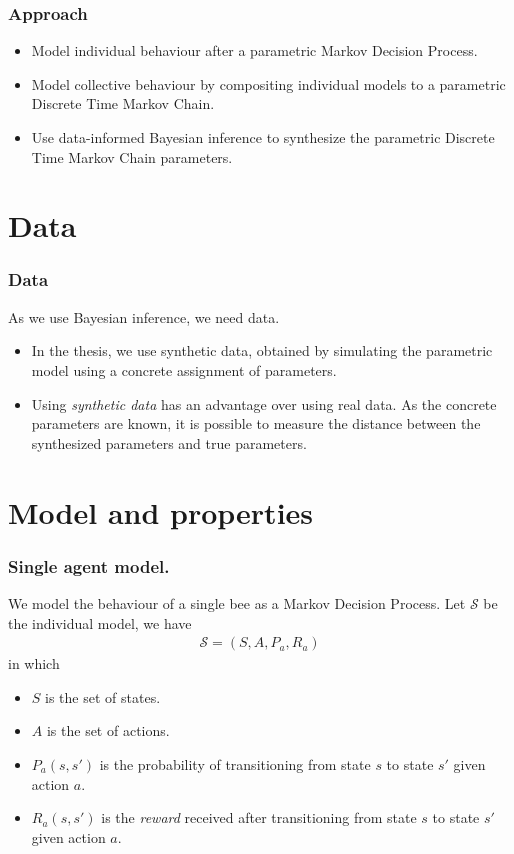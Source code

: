 \documentclass{beamer}
\begin{document}
\begin{frame}
  \frametitle{Approach}
  \begin{itemize}
  \item Model individual behaviour after a parametric Markov Decision Process.
  \item Model collective behaviour by compositing individual models to a
    parametric Discrete Time Markov Chain.
  \item Use data-informed Bayesian inference to synthesize the parametric
    Discrete Time Markov Chain parameters.
  \end{itemize}
\end{frame}

\section{Data}
\begin{frame}
  \frametitle{Data}
  As we use Bayesian inference, we need data.
  \begin{itemize}
  \item In the thesis, we use synthetic data, obtained by simulating the
    parametric model using a concrete assignment of parameters.
  \item Using \textit{synthetic data} has an advantage over using real data.
    As the concrete parameters are known, it is possible to measure the
    distance between the synthesized parameters and true parameters.
  \end{itemize}
\end{frame}

\section{Model and properties}
\begin{frame}
  \frametitle{Single agent model.}
  We model the behaviour of a single bee as a Markov Decision Process. Let
  $\mathcal{S}$ be the individual model, we have
  \begin{align*}
    \mathcal{S} = (S, A, P_a, R_a)
  \end{align*}
  in which
  \begin{itemize}
  \item $S$ is the set of states.
  \item $A$ is the set of actions.
  \item $P_a(s,s')$ is the probability of transitioning from state $s$ to state
    $s'$ given action $a$.
  \item $R_a(s,s')$ is the \textit{reward} received after transitioning from
    state $s$ to state $s'$ given action $a$.
  \end{itemize}
\end{frame}
\end{document}
